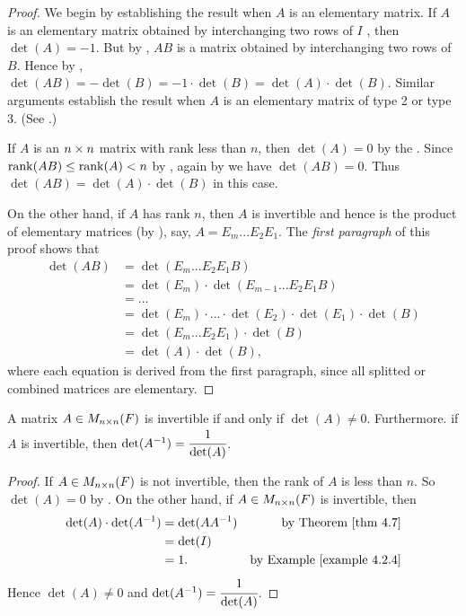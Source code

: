 \begin{proof}
We begin by establishing the result when \(A\) is an elementary matrix.
If \(A\) is an elementary matrix obtained by interchanging two rows of \(I\) , then \(\det(A) = -1\).
But by , \(AB\) is a matrix obtained by
interchanging two rows of \(B\).
Hence by , \(\det(AB) = -\det(B) = -1 \cdot \det(B) = \det(A) \cdot \det(B)\).
Similar arguments establish the result when \(A\) is an elementary matrix of type 2 or type 3.
(See .)

If \(A\) is an \(n \times n\) matrix with rank less than \(n\), then \(\det(A) = 0\) by the .
Since \(\mathrm{rank}(AB) \le \mathrm{rank}(A) < n\) by , again by  we have \(\det(AB) = 0\).
Thus \(\det(AB) = \det(A) \cdot \det(B)\) in this case.

On the other hand, if \(A\) has rank \(n\), then \(A\) is invertible and hence is the product of elementary matrices (by ),
say, \(A = E_m ... E_2E_1\).
The \emph{first paragraph} of this proof shows that
\begin{align*}
    \det(AB) & = \det(E_m ... E_2 E_1 B) \\
             & = \det(E_m) \cdot \det(E_{m-1} ... E_2 E_1 B) \\
             & = ... \\
             & = \det(E_m) \cdot ... \cdot \det(E_2) \cdot \det(E_1) \cdot \det(B) \\
             & = \det(E_m ... E_2 E_1) \cdot \det(B) \\
             & = \det(A) \cdot \det(B),
\end{align*}
where each equation is derived from the first paragraph, since all splitted or combined matrices are elementary.
\end{proof}

\begin{corollary} \label{corollary 4.7.1}
A matrix \(A \in M_{n \times n}(F)\) is invertible if and only if \(\det(A) \ne 0\).
Furthermore. if \(A\) is invertible, then \(\det(A^{-1}) = \cfrac1{\det(A)}\).
\end{corollary}

\begin{proof}
If \(A \in M_{n \times n}(F)\) is not invertible, then the rank of \(A\) is less than \(n\).
So \(\det(A) = 0\) by .
On the other hand, if \(A \in M_{n \times n}(F)\) is invertible, then
\begin{align*}
    \det(A) \cdot \det(A^{-1}) & = \det(A A^{-1}) & \text{by \THM{4.7}} \\
                               & = \det(I) \\
                               & = 1. & \text{by \EXAMPLE{4.2.4}}
\end{align*}
Hence \(\det(A) \ne 0\) and \(\det(A^{-1}) = \cfrac1{\det(A)}\).
\end{proof}

